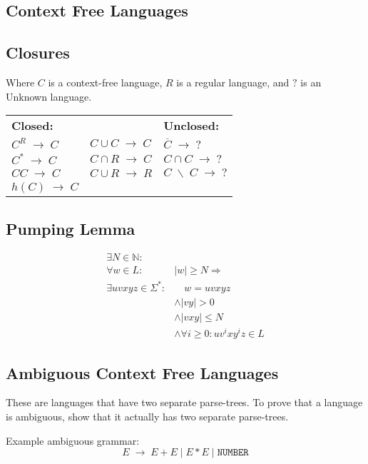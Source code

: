 \documentclass[10pt,landscape]{article}
\newcommand{\spto}{\;\to\;}
\newcommand{\spbackslash}{\;\backslash\;}
\newcommand{\impl}{\Rightarrow}
\newlength{\templength}
\begin{document}
\begin{multicols*}{3}
\section{Context Free Languages}

\subsection{Closures}
Where $C$ is a context-free language, $R$ is a regular language, and $?$ is
an Unknown language.

\settowidth{\templength}{$C \cup C \spto C$}
\addtolength{\templength}{1cm}
\begin{tabular}{lp{\templength}l}
\textbf{Closed:} & & \textbf{Unclosed:} \\
$C^R \spto C$ & $C \cup C \spto C$ & $\overline{C} \spto ?$\\
$C^* \spto C$ & $C \cap R \spto C$ & $C \cap C \spto ?$\\
$CC \spto C$  & $C \cup R \spto R$ & $C \spbackslash C \spto ?$\\
$h(C) \spto C$ & & \\
\end{tabular}

\subsection{Pumping Lemma}
\begin{align*}
  \exists N \in \mathbb{N}: & \\
          \forall w \in L : & |w| \geq N \impl \\
\exists uvxyz \in \Sigma^*: & \quad w = uvxyz \\
                            & \land |vy| > 0 \\
                            & \land |vxy| \leq N \\
                            & \land \forall i \geq 0: uv^ixy^iz \in L
\end{align*}

\subsection{Ambiguous Context Free Languages}
These are languages that have two separate parse-trees. To prove
that a language is ambiguous, show that it actually has two separate
parse-trees.

Example ambiguous grammar:
\[
    E \spto E + E \;|\; E * E \;|\; \texttt{NUMBER}
\]


\end{multicols*}
\end{document}
